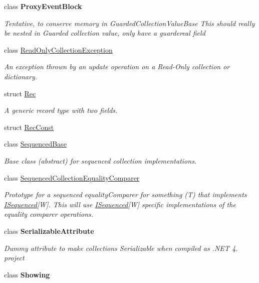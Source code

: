 \begin{DoxyCompactItemize}
class {\bfseries Proxy\+Event\+Block}
\begin{DoxyCompactList}\small\item\em Tentative, to conserve memory in Guarded\+Collection\+Value\+Base This should really be nested in Guarded collection value, only have a guardereal field \end{DoxyCompactList}\item 
class \hyperlink{class_c5_1_1_read_only_collection_exception}{Read\+Only\+Collection\+Exception}
\begin{DoxyCompactList}\small\item\em An exception thrown by an update operation on a Read-\/\+Only collection or dictionary. \end{DoxyCompactList}\item 
struct \hyperlink{struct_c5_1_1_rec}{Rec}
\begin{DoxyCompactList}\small\item\em A generic record type with two fields. \end{DoxyCompactList}\item 
struct \hyperlink{struct_c5_1_1_rec_const}{Rec\+Const}
\item 
class \hyperlink{class_c5_1_1_sequenced_base}{Sequenced\+Base}
\begin{DoxyCompactList}\small\item\em Base class (abstract) for sequenced collection implementations. \end{DoxyCompactList}\item 
class \hyperlink{class_c5_1_1_sequenced_collection_equality_comparer}{Sequenced\+Collection\+Equality\+Comparer}
\begin{DoxyCompactList}\small\item\em Prototype for a sequenced equality\+Comparer for something (T) that implements \hyperlink{interface_c5_1_1_i_sequenced}{I\+Sequenced}\mbox{[}W\mbox{]}. This will use \hyperlink{interface_c5_1_1_i_sequenced}{I\+Sequenced}\mbox{[}W\mbox{]} specific implementations of the equality comparer operations. \end{DoxyCompactList}\item 
class {\bfseries Serializable\+Attribute}
\begin{DoxyCompactList}\small\item\em Dummy attribute to make collections Serializable when compiled as .N\+E\+T 4. project \end{DoxyCompactList}\item 
class {\bfseries Showing}

\end{DoxyCompactItemize}
